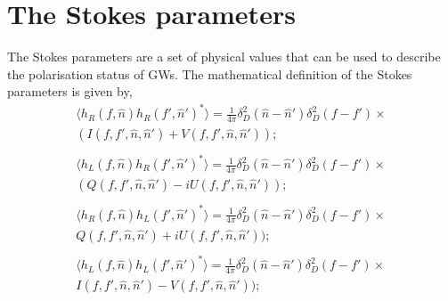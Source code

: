 \documentclass[aps,twocolumn,showpacs,groupedaddress, nofootinbib]{revtex4}  %
\begin{document}
\section{The Stokes parameters}\label{sec:stokes}
The Stokes parameters \cite{seto2007measuring} are a set of physical values that can be used to describe the polarisation status of \acp{GW}. 
The mathematical definition of the Stokes parameters is given by,
\begin{align}\label{eq:stokesp}
 \langle h_R(f, \hat{n}) h_R(f', \hat{n}')^{*}\rangle = \frac{1}{4\pi}\delta_{D}^2(\hat{n} - \hat{n}')\delta_{D}^2(f - f') \times \nonumber\\
 (I(f, f', \hat{n}, \hat{n}') + V(f, f', \hat{n}, \hat{n}')); \nonumber\\
 \nonumber\\ 
 \langle h_L(f, \hat{n}) h_R(f', \hat{n}')^{*}\rangle = \frac{1}{4\pi}\delta_{D}^2(\hat{n} - \hat{n}')\delta_{D}^2(f - f') \times \nonumber\\
 (Q(f, f', \hat{n}, \hat{n}') - iU(f, f', \hat{n}, \hat{n}')); \nonumber\\ 
 \nonumber\\ 
 \langle h_R(f, \hat{n}) h_L(f', \hat{n}')^{*}\rangle = \frac{1}{4\pi}\delta_{D}^2(\hat{n} - \hat{n}')\delta_{D}^2(f - f') \times \nonumber\\
 Q(f, f', \hat{n}, \hat{n}') + iU(f, f', \hat{n}, \hat{n}')); \nonumber\\ 
 \nonumber\\ 
 \langle h_L(f, \hat{n}) h_L(f', \hat{n}')^{*}\rangle = \frac{1}{4\pi}\delta_{D}^2(\hat{n} - \hat{n}')\delta_{D}^2(f - f') \times \nonumber\\
 I(f, f',  \hat{n}, \hat{n}') - V(f, f', \hat{n}, \hat{n}'));
\end{align} 
\end{document}
